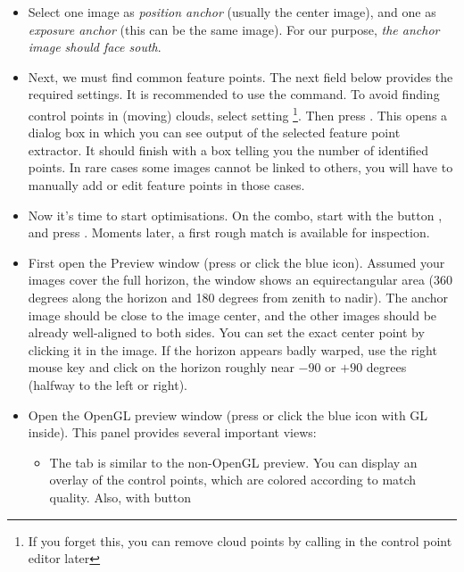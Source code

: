 \begin{itemize}
\item Select one image as \emph{position anchor} (usually the center
  image), and one as \emph{exposure anchor} (this can be the same
  image). For our purpose, \emph{the anchor image should face
    south}.
\item Next, we must find common feature points. The next field below
  provides the required settings. It is recommended to use the 
  command. To avoid finding control points in (moving) clouds, select
  setting \footnote{If you forget this,
    you can remove cloud points by calling  in the control
    point editor later}. Then press . This
  opens a dialog box in which you can see output of the selected
  feature point extractor. It should finish with a box telling you the
  number of identified points. In rare cases some images cannot be
  linked to others, you will have to manually add or edit feature
  points in those cases.
\item Now it's time to start optimisations. On the  combo, start with the button , and press . Moments later, a first rough
  match is available for inspection.
\item First open the Preview window (press  or click the blue icon). Assumed
  your images cover the full horizon, the window shows an
  equirectangular area (360 degrees along the horizon and 180 degrees
  from zenith to nadir). The anchor image should be close to the image
  center, and the other images should be already well-aligned to both
  sides. You can set the exact center point by clicking it in the
  image. If the horizon appears badly warped, use the right mouse key and
  click on the horizon roughly near $-90$ or $+90$ degrees (halfway to
  the left or right).
\item Open the OpenGL preview window (press  or click the blue icon
  with GL inside). This panel provides several important views:
  \begin{itemize}
  \item The  tab is similar to the non-OpenGL preview. You can
    display an overlay of the control points, which are colored
    according to match quality. Also, with button 

\end{itemize}
\end{itemize}
